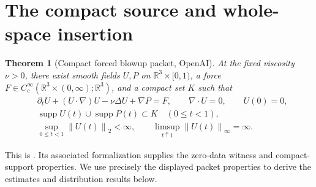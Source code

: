 \documentclass[11pt,a4paper]{article}
\newtheorem{theorem}{Theorem}[section]
\theoremstyle{definition}\newtheorem{definition}[theorem]{Definition}
\theoremstyle{remark}\newtheorem{remark}[theorem]{Remark}
\newcommand{\R}{\mathbb R}\newcommand{\TT}{\mathbb T^3}
\newcommand{\norm}[1]{\left\lVert#1\right\rVert}
\DeclareMathOperator{\supp}{supp}
\begin{document}
\section{The compact source and whole-space insertion}
\begin{theorem}[Compact forced blowup packet, OpenAI]\label{thm:packet}
At the fixed viscosity $\nu>0$, there exist smooth fields $U,P$ on
$\R^3\times[0,1)$, a force
$F\in C_c^\infty(\R^3\times(0,\infty);\R^3)$, and a compact set $K$ such that
\begin{align}
 &\partial_tU+(U\cdot\nabla)U-\nu\Delta U+\nabla P=F,\qquad
 \nabla\cdot U=0,\qquad U(0)=0,\label{eq:packet}\\
 &\supp U(t)\cup\supp P(t)\subset K\quad(0\le t<1),\nonumber\\
 &\sup_{0\le t<1}\norm{U(t)}_2<\infty,\qquad
 \limsup_{t\uparrow1}\norm{U(t)}_\infty=\infty.\label{eq:packetblowup}
\end{align}
\end{theorem}
This is \cite[Theorem 1.1]{openai}. Its associated formalization \cite{lean} supplies the zero-data witness and compact-support properties. We use precisely the displayed packet properties to derive the estimates and distribution results below.
\end{document}

